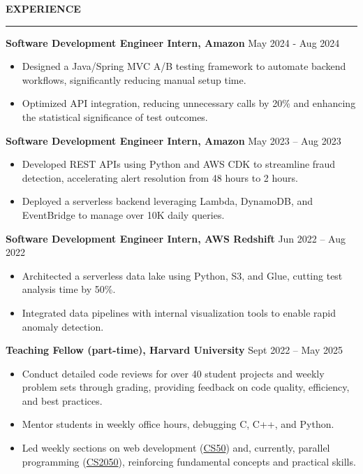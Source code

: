 \documentclass[11pt,a4paper]{article}
\newcommand{\sectionheading}[1]{\vspace{0.2cm}\textbf{\Large #1}\vspace{0.1cm}\hrule\vspace{0.3cm}}
\newcommand{\daterange}[1]{\hfill{#1}}
\begin{document}
\sectionheading{EXPERIENCE}

\textbf{Software Development Engineer Intern, Amazon} \hfill \daterange{May 2024 - Aug 2024}
\begin{itemize}[leftmargin=*,nosep]
    \item Designed a Java/Spring MVC A/B testing framework to automate backend workflows, significantly reducing manual setup time.
    \item Optimized API integration, reducing unnecessary calls by 20\% and enhancing the statistical significance of test outcomes.
\end{itemize}

\medskip
\textbf{Software Development Engineer Intern, Amazon} \hfill \daterange{May 2023 -- Aug 2023}
\smallskip

\begin{itemize}[leftmargin=*,nosep]
    \item Developed REST APIs using Python and AWS CDK to streamline fraud detection, accelerating alert resolution from 48 hours to 2 hours.
    \item Deployed a serverless backend leveraging Lambda, DynamoDB, and EventBridge to manage over 10K daily queries.
\end{itemize}

\medskip
\textbf{Software Development Engineer Intern, AWS Redshift} \hfill \daterange{Jun 2022 -- Aug 2022}
\begin{itemize}[leftmargin=*,nosep]
    \item Architected a serverless data lake using Python, S3, and Glue, cutting test analysis time by 50\%.
    \item Integrated data pipelines with internal visualization tools to enable rapid anomaly detection.
\end{itemize}

\medskip
\textbf{Teaching Fellow (part-time), Harvard University} \hfill \daterange{Sept 2022 -- May 2025}
\begin{itemize}[leftmargin=*,nosep]
    \item Conduct detailed code reviews for over 40 student projects and weekly problem sets through grading, providing feedback on code quality, efficiency, and best practices.
    \item Mentor students in weekly office hours, debugging C, C++, and Python.
    \item Led weekly sections on web development (\href{https://cs50.harvard.edu/college/2023/fall/}{CS50}) and, currently, parallel programming (\href{https://sites.google.com/g.harvard.edu/cs-2050/syllabus}{CS2050}), reinforcing fundamental concepts and practical skills.
\end{itemize}
\end{document}

